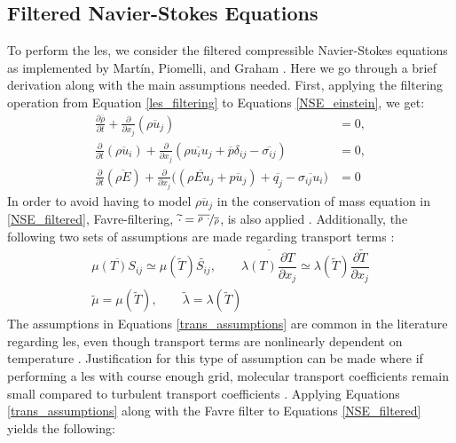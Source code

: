 \subsection{Filtered Navier-Stokes Equations}
To perform the \gls{les}, we consider the filtered compressible Navier-Stokes equations as implemented by Mart\'{i}n, Piomelli, and Graham \cite{LES_Comp}. Here we go through a brief derivation along with the main assumptions needed. First, applying the filtering operation from Equation \ref{les_filtering} to Equations \ref{NSE_einstein}, we get:
\begin{subequations} \label{NSE_filtered}
\begin{align}
  \frac{\partial\overline{\rho}}{\partial t} + \frac{\partial }{\partial x_j} \left( \overline{\rho u_j} \right) &= 0,  \label{mass_filtered} \\
  \frac{\partial}{\partial t} \left( \overline{\rho u_i }\right) + \frac{\partial}{\partial x_j} \left(\overline{\rho u_i u_j} + \overline{p }\delta_{ij} - \overline{\sigma_{ij}} \right) &= 0,  \label{mom_filtered} \\
  \frac{\partial}{\partial t} \left( \overline{\rho E} \right) + \frac{\partial}{\partial x_j} \big(\left( \overline{\rho Eu_j}+\overline{p u_j} \right) + \overline{q_j} - \overline{\sigma_{ij} u_i}\big) &= 0 \label{en_filtered}
\end{align}
\end{subequations}
In order to avoid having to model $\overline{\rho u_j} $ in the conservation of mass equation in \ref{NSE_filtered}, Favre-filtering, $\widetilde{\cdot}  = \nicefrac{\overline{\rho~\cdot}}{\overline{\rho}}$, is also applied \cite{}. Additionally, the following two sets of assumptions are made regarding transport terms \cite{}:
\begin{subequations} \label{trans_assumptions}
\begin{align}
\overline{\mu(T)S_{ij}} \simeq \mu(\widetilde{T})\widetilde{S_{ij}}, \quad \quad 
\overline{\lambda(T)\dfrac{\partial T}{\partial x_j}} \simeq \lambda(\widetilde{T})\dfrac{ \partial \widetilde{T}}{\partial x_j} \label{trans_1}\\
\widetilde{\mu} = \mu(\widetilde{T}), \quad \quad \widetilde{\lambda} = \lambda(\widetilde{T}) \label{trans_2}
\end{align}
\end{subequations}
The assumptions in Equations \ref{trans_assumptions} are common in the literature regarding \gls{les}, even though transport terms are nonlinearly dependent on temperature \cite{}. Justification for this type of assumption can be made where if performing a \gls{les} with course enough grid, molecular transport coefficients remain small compared to turbulent transport coefficients \cite{}. Applying Equations \ref{trans_assumptions} along with the Favre filter to Equations \ref{NSE_filtered} yields the following:
